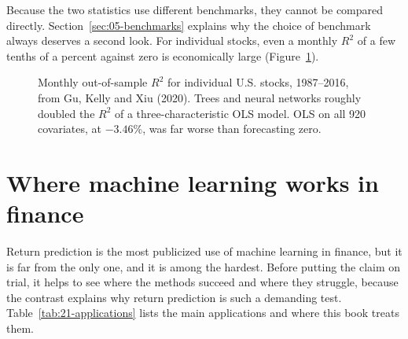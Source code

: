 Because the two statistics use different benchmarks, they cannot be compared directly. Section~\ref{sec:05-benchmarks} explains why the choice of benchmark always deserves a second look. For individual stocks, even a monthly $R^2$ of a few tenths of a percent against zero is economically large (Figure~\ref{fig:21-gkx}).

\begin{figure}[htbp]
\centering
{}
\caption{Monthly out-of-sample $R^2$ for individual U.S. stocks, 1987--2016, from Gu, Kelly and Xiu (2020). Trees and neural networks roughly doubled the $R^2$ of a three-characteristic OLS model. OLS on all 920 covariates, at $-3.46\%$, was far worse than forecasting zero.}
\label{fig:21-gkx}
\end{figure}


\section{Where machine learning works in finance}
\label{sec:21-applications}

Return prediction is the most publicized use of machine learning in finance, but it is far from the only one, and it is among the hardest. Before putting the claim on trial, it helps to see where the methods succeed and where they struggle, because the contrast explains why return prediction is such a demanding test. Table~\ref{tab:21-applications} lists the main applications and where this book treats them.

